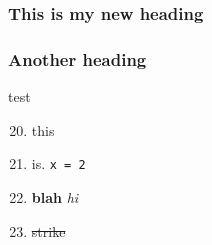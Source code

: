 \documentclass{article}
\begin{document}
\subsubsection{This is my new heading}

\subsubsection{Another heading}

test 
\begin{enumerate}
    \setcounter{enumi}{19}
    \item this
    \item is. \verb|x = 2|
    \item \textbf{blah} \textit{hi}
    \item \sout{strike}
\end{enumerate}
\end{document}
